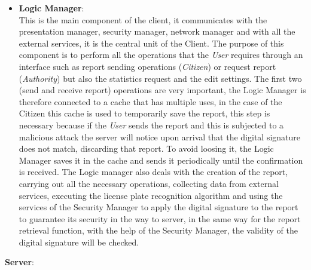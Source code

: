 \documentclass{article}
\begin{document}
\begin{itemize}
\item \textbf{Logic Manager}: \\
This is the main component of the client, it communicates with the presentation manager, 
security manager, network manager and with all the external services, it is the central 
unit of the Client. The purpose of this component is to perform all the operations that 
the \textit{User} requires through an interface such as report sending operations (\textit{Citizen}) 
or request report (\textit{Authority}) but also the statistics request and the edit settings. 
The first two (send and receive report) operations are very important, the Logic Manager 
is therefore connected to a cache that has multiple uses, in the case of the {Citizen} this 
cache is used to temporarily save the report, this step is necessary because if the \textit{User} 
sends the report and this is subjected to a malicious attack the server will notice upon 
arrival that the digital signature does not match, discarding that report. To avoid loosing it, 
the Logic Manager saves it in the cache and sends it periodically until the confirmation is 
received. The Logic manager also deals with the creation of the report, carrying out all the 
necessary operations, collecting data from external services, executing the license plate 
recognition algorithm and using the services of the Security Manager to apply the digital 
signature to the report to guarantee its security in the way to server, in the same 
way for the report retrieval function, with the help of the Security Manager, the validity of 
the digital signature will be checked. 
\end{itemize}

\textbf{Server}:
\end{document}

